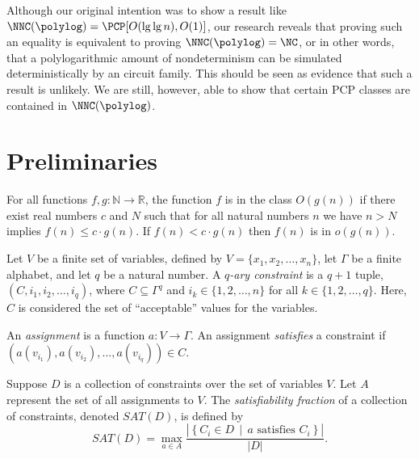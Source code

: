 \documentclass[]{article}
\begin{document}
Although our original intention was to show a result like $\NNC(\polylog) = \PCP[O(\lg \lg n), O(1)]$, our research reveals that proving such an equality is equivalent to proving $\NNC(\polylog) = \NC$, or in other words, that a polylogarithmic amount of nondeterminism can be simulated deterministically by an \NC{} circuit family.
This should be seen as evidence that such a result is unlikely.
We are still, however, able to show that certain PCP classes are contained in $\NNC(\polylog)$.

\section{Preliminaries}

\begin{definition}
  For all functions $f, g \colon \mathbb{N} \to \mathbb{R}$, the function $f$ is in the class $O(g(n))$ if there exist real numbers $c$ and $N$ such that for all natural numbers $n$ we have $n > N$ implies $f(n) \leq c \cdot g(n)$.
  If $f(n) < c \cdot g(n)$ then $f(n)$ is in $o(g(n))$.
\end{definition}

\begin{definition}
  Let $V$ be a finite set of variables, defined by $V = \{x_1, x_2, \dotsc, x_n\}$, let $\Gamma$ be a finite alphabet, and let $q$ be a natural number.
  A \emph{$q$-ary constraint} is a $q + 1$ tuple, $(C, i_1, i_2, \dotsc, i_q)$, where $C \subseteq \Gamma^q$ and $i_k \in \{1, 2, \dotsc, n\}$ for all $k \in \{1, 2, \ldots, q\}$.
  Here, $C$ is considered the set of ``acceptable'' values for the variables.

  An \emph{assignment} is a function $a \colon V \to \Gamma$.
  An assignment \emph{satisfies} a constraint if $(a(v_{i_1}), a(v_{i_2}), \dotsc, a(v_{i_q})) \in C$.
\end{definition}

\begin{definition}
  Suppose $D$ is a collection of constraints over the set of variables $V$.
  Let $A$ represent the set of all assignments to $V$.
  The \emph{satisfiability fraction} of a collection of constraints, denoted $SAT(D)$, is defined by
  \begin{equation*}
    SAT(D) = \max_{a \in A}{\frac{\left|\left\{ C_i \in D \, \middle| \, a \text{ satisfies } C_i \right\}\right|}{\left|D\right|}}.
  \end{equation*}
\end{definition}
\end{document}
